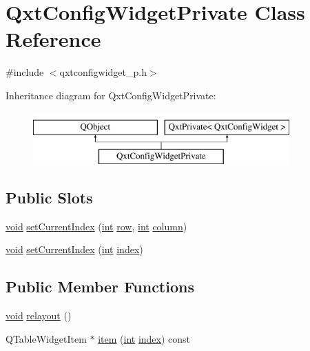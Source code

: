 \hypertarget{class_qxt_config_widget_private}{\section{Qxt\-Config\-Widget\-Private Class Reference}
\label{class_qxt_config_widget_private}
}


{\ttfamily \#include $<$qxtconfigwidget\-\_\-p.\-h$>$}

Inheritance diagram for Qxt\-Config\-Widget\-Private\-:\begin{figure}[H]
\begin{center}
\leavevmode
\includegraphics[height=2.000000cm]{class_qxt_config_widget_private}
\end{center}
\end{figure}
\subsection*{Public Slots}
\begin{DoxyCompactItemize}
\item 
\hyperlink{group___u_a_v_objects_plugin_ga444cf2ff3f0ecbe028adce838d373f5c}{void} \hyperlink{class_qxt_config_widget_private_ad59f94f96b7fe137035fcda75250f1c1}{set\-Current\-Index} (\hyperlink{ioapi_8h_a787fa3cf048117ba7123753c1e74fcd6}{int} \hyperlink{glext_8h_a11b277b422822f784ee248b43eee3e1e}{row}, \hyperlink{ioapi_8h_a787fa3cf048117ba7123753c1e74fcd6}{int} \hyperlink{glext_8h_a3b58c39b1b7ca6f4012b27e84de3bdb3}{column})
\item 
\hyperlink{group___u_a_v_objects_plugin_ga444cf2ff3f0ecbe028adce838d373f5c}{void} \hyperlink{class_qxt_config_widget_private_a292ecf9886f09204fd6d12073f6ec54c}{set\-Current\-Index} (\hyperlink{ioapi_8h_a787fa3cf048117ba7123753c1e74fcd6}{int} \hyperlink{glext_8h_ab47dd9958bcadea08866b42bf358e95e}{index})
\end{DoxyCompactItemize}
\subsection*{Public Member Functions}
\begin{DoxyCompactItemize}
\item 
\hyperlink{group___u_a_v_objects_plugin_ga444cf2ff3f0ecbe028adce838d373f5c}{void} \hyperlink{class_qxt_config_widget_private_a0c6e530cdc78f8369a301f2f3ef6969a}{relayout} ()
\item 
Q\-Table\-Widget\-Item $\ast$ \hyperlink{class_qxt_config_widget_private_a8e7a66e60de901974cd540b8e600ae22}{item} (\hyperlink{ioapi_8h_a787fa3cf048117ba7123753c1e74fcd6}{int} \hyperlink{glext_8h_ab47dd9958bcadea08866b42bf358e95e}{index}) const 
\end{DoxyCompactItemize}
